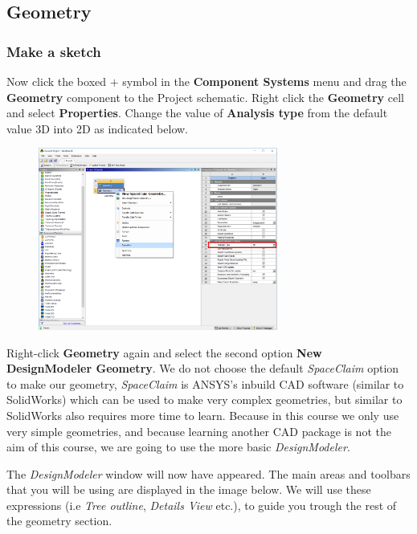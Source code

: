 \documentclass[11pt,a4paper,oneside,hidelinks]{scrartcl}
\newcommand\bfr[1]{\textcolor[rgb]{1,0.00,0.00}{\textbf{\textsf{#1}}}}
\begin{document}
\subsection{Geometry}


\subsubsection{Make a sketch}
Now click the boxed $+$ symbol in the \bfr{Component Systems} menu and drag the \bfr{Geometry} component to the Project schematic. Right click the \bfr{Geometry} cell and select \bfr{Properties}. Change the value of \bfr{Analysis type} from the default value 3D into 2D as indicated below.

\begin{figure}[H]
\begin{center}
\includegraphics[width=0.7\textwidth,clip]{geometry_analysis_type.png}
\end{center}
\end{figure}

Right-click \bfr{Geometry} again and select the second option \bfr{New DesignModeler Geometry}. We do not choose the default \emph{SpaceClaim} option to make our geometry, \emph{SpaceClaim} is ANSYS's inbuild CAD software (similar to SolidWorks) which can be used to make very complex geometries, but similar to SolidWorks also requires more time to learn. Because in this course we only use very simple geometries, and because learning another CAD package is not the aim of this course, we are going to use the more basic \emph{DesignModeler}.

The \emph{DesignModeler} window will now have appeared. The main areas and toolbars that you will be using are displayed in the image below. We will use these expressions (i.e \emph{Tree outline}, \emph{Details View} etc.), to guide you trough the rest of the geometry section.
\end{document}
